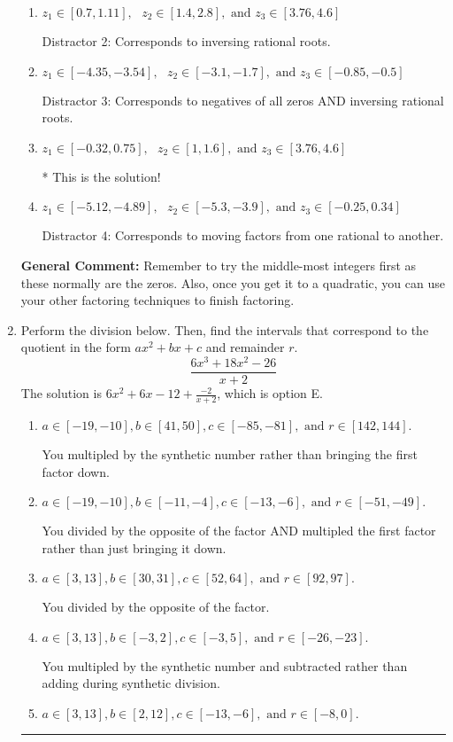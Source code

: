 \documentclass{extbook}[14pt]
\newcommand{\litem}[1]{\item #1

\rule{\textwidth}{0.4pt}}
\begin{document}
\begin{enumerate}
{\begin{enumerate}[label=\Alph*.]
 Distractor 1: Corresponds to negatives of all zeros.
\item \( z_1 \in [0.7, 1.11], \text{   }  z_2 \in [1.4, 2.8], \text{   and   } z_3 \in [3.76, 4.6] \)

 Distractor 2: Corresponds to inversing rational roots.
\item \( z_1 \in [-4.35, -3.54], \text{   }  z_2 \in [-3.1, -1.7], \text{   and   } z_3 \in [-0.85, -0.5] \)

 Distractor 3: Corresponds to negatives of all zeros AND inversing rational roots.
\item \( z_1 \in [-0.32, 0.75], \text{   }  z_2 \in [1, 1.6], \text{   and   } z_3 \in [3.76, 4.6] \)

* This is the solution!
\item \( z_1 \in [-5.12, -4.89], \text{   }  z_2 \in [-5.3, -3.9], \text{   and   } z_3 \in [-0.25, 0.34] \)

 Distractor 4: Corresponds to moving factors from one rational to another.
\end{enumerate}

\textbf{General Comment:} Remember to try the middle-most integers first as these normally are the zeros. Also, once you get it to a quadratic, you can use your other factoring techniques to finish factoring.
}
\litem{
Perform the division below. Then, find the intervals that correspond to the quotient in the form $ax^2+bx+c$ and remainder $r$.
\[ \frac{6x^{3} +18 x^{2} -26}{x + 2} \]The solution is \( 6x^{2} +6 x -12 + \frac{-2}{x + 2} \), which is option E.\begin{enumerate}[label=\Alph*.]
\item \( a \in [-19, -10], b \in [41, 50], c \in [-85, -81], \text{ and } r \in [142, 144]. \)

 You multipled by the synthetic number rather than bringing the first factor down.
\item \( a \in [-19, -10], b \in [-11, -4], c \in [-13, -6], \text{ and } r \in [-51, -49]. \)

 You divided by the opposite of the factor AND multipled the first factor rather than just bringing it down.
\item \( a \in [3, 13], b \in [30, 31], c \in [52, 64], \text{ and } r \in [92, 97]. \)

 You divided by the opposite of the factor.
\item \( a \in [3, 13], b \in [-3, 2], c \in [-3, 5], \text{ and } r \in [-26, -23]. \)

 You multipled by the synthetic number and subtracted rather than adding during synthetic division.
\item \( a \in [3, 13], b \in [2, 12], c \in [-13, -6], \text{ and } r \in [-8, 0]. \)


\end{enumerate}}
\end{enumerate}
\end{document}
